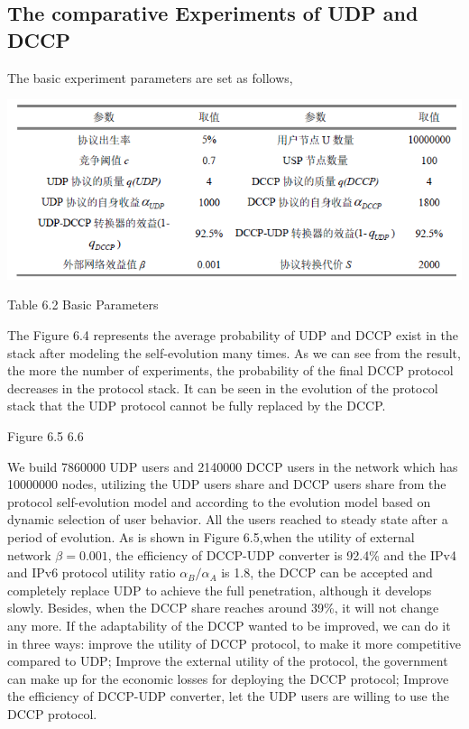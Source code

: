\documentclass{article}
\begin{document}
\subsection{The comparative Experiments of UDP and DCCP}
The basic experiment parameters are set as follows,
\par
\centerline{\includegraphics[width=.6\textwidth]{Table6.png}}
\centerline{Table 6.2 Basic Parameters}
The Figure 6.4 represents the average probability of UDP and DCCP exist in the stack after modeling the self-evolution 
many times. As we can see from the result, the more the number of experiments, the probability of the final DCCP 
protocol decreases in the protocol stack.  It can be seen in the evolution of the protocol stack that the UDP protocol 
cannot be fully replaced by the DCCP.

Figure 6.5 6.6

We build 7860000 UDP users and 2140000 DCCP users in the network which has 10000000 nodes, utilizing the UDP users 
share and DCCP users share from the protocol self-evolution model and according to the evolution model based on 
dynamic selection of user behavior. All the users reached to steady state after a period of evolution. As is shown 
in Figure 6.5,when the utility of external network $\beta=0.001$, the efficiency of DCCP-UDP converter is 92.4\% 
and the IPv4 and IPv6 protocol utility ratio $\alpha_B/\alpha_A$ is 1.8, the DCCP can be accepted and completely 
replace UDP to achieve the full penetration, although it develops slowly. Besides, when the DCCP share reaches around 
39\%, it will not change any more. If the adaptability of the DCCP wanted to be improved, we can do it in three ways: 
improve the utility of DCCP protocol, to make it more competitive compared to UDP; Improve the external utility of 
the protocol, the government can make up for the economic losses for deploying the DCCP protocol; Improve the efficiency 
of DCCP-UDP converter, let the UDP users are willing to use the DCCP protocol.
\end{document}
